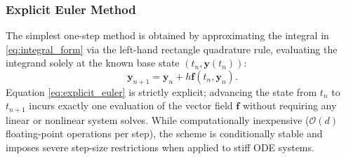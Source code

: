 \documentclass[11pt,a4paper]{article}
\theoremstyle{definition}
\theoremstyle{remark}
\begin{document}
\subsubsection{Explicit Euler Method}
The simplest one-step method is obtained by approximating the integral in \eqref{eq:integral_form} via the left-hand rectangle quadrature rule, evaluating the integrand solely at the known base state $(t_n, \mathbf{y}(t_n))$:
\begin{equation}
\label{eq:explicit_euler}
\mathbf{y}_{n+1} = \mathbf{y}_n + h \mathbf{f}(t_n, \mathbf{y}_n).
\end{equation}
Equation \eqref{eq:explicit_euler} is strictly explicit; advancing the state from $t_n$ to $t_{n+1}$ incurs exactly one evaluation of the vector field $\mathbf{f}$ without requiring any linear or nonlinear system solves. While computationally inexpensive ($\mathcal{O}(d)$ floating-point operations per step), the scheme is conditionally stable and imposes severe step-size restrictions when applied to stiff ODE systems.
\end{document}
